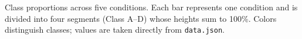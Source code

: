 \caption{Class proportions across five conditions. Each bar represents one condition and is divided into four segments (Class A--D) whose heights sum to 100\%. Colors distinguish classes; values are taken directly from \texttt{data.json}.}
